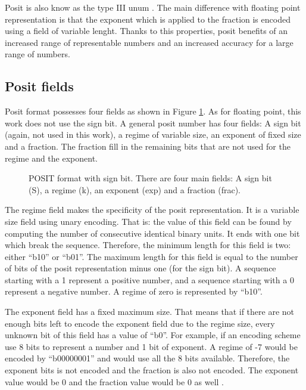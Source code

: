 Posit is also know as the type III \gls{unum} \cite{unum_wiki}. The main difference with floating point representation is that the exponent which is applied to the fraction is encoded using a field of variable lenght. Thanks to this properties, posit benefits of an increased range of representable numbers and an increased accuracy for a large range of numbers.

\subsection{Posit fields}

Posit format possesses four fields as shown in Figure \ref{fig:posit_shema}. As for floating point, this work does not use the sign bit. A general posit number has four fields: A sign bit (again, not used in this work), a regime of variable size, an exponent of fixed size and a fraction. The fraction fill in the remaining bits that are not used for the regime and the exponent.

\begin{figure}[!ht]
\begin{mdframed}
\centering

\caption{POSIT format with sign bit. There are four main fields: A sign bit (S), a regime (k), an exponent (exp) and a fraction (frac).}
\label{fig:posit_shema}
\end{mdframed}
\end{figure}

The regime field makes the specificity of the posit representation. It is a variable size field using unary encoding. That is: the value of this field can be found by computing the number of consecutive identical binary units. It ends with one bit which break the sequence. Therefore, the minimum length for this field is two: either ``b10'' or ``b01''. The maximum length for this field is equal to the number of bits of the posit representation minus one (for the sign bit). A sequence starting with a 1 represent a positive number, and a sequence starting with a 0 represent a negative number. A regime of zero is represented by ``b10''.

The exponent field has a fixed maximum size. That means that if there are not enough bits left to encode the exponent field due to the regime size, every unknown bit of this field has a value of ``b0''. For example, if an encoding scheme use 8 bits to represent a number and 1 bit of exponent. A regime of -7 would be encoded by ``b00000001'' and would use all the 8 bits available. Therefore, the exponent bits is not encoded and the fraction is also not encoded. The exponent value would be 0 and the fraction value would be 0 as well .

